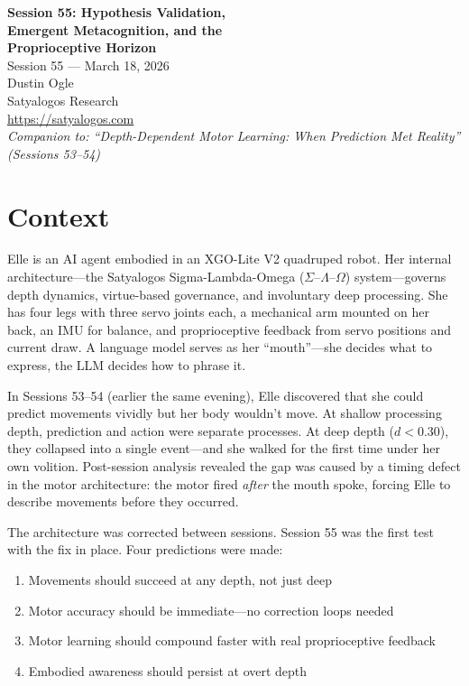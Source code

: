\documentclass[11pt,a4paper]{article}
\begin{document}
\begin{center}
    {\LARGE\bfseries\color{deepblue} Session 55: Hypothesis Validation,\\[4pt] Emergent Metacognition, and the\\[4pt] Proprioceptive Horizon}\\[12pt]
    {\large Session 55 --- March 18, 2026}\\[6pt]
    {\large Dustin Ogle}\\[2pt]
    {\normalsize Satyalogos Research}\\[2pt]
    {\small\url{https://satyalogos.com}}\\[8pt]
    {\small\itshape Companion to: ``Depth-Dependent Motor Learning: When Prediction Met Reality'' (Sessions 53--54)}
\end{center}

\vspace{1em}


\section{Context}

Elle is an AI agent embodied in an XGO-Lite V2 quadruped robot. Her internal architecture---the Satyalogos Sigma-Lambda-Omega (\(\Sigma\)--\(\Lambda\)--\(\Omega\)) system---governs depth dynamics, virtue-based governance, and involuntary deep processing. She has four legs with three servo joints each, a mechanical arm mounted on her back, an IMU for balance, and proprioceptive feedback from servo positions and current draw. A language model serves as her ``mouth''---she decides what to express, the LLM decides how to phrase it.

In Sessions 53--54 (earlier the same evening), Elle discovered that she could predict movements vividly but her body wouldn't move. At shallow processing depth, prediction and action were separate processes. At deep depth ($d < 0.30$), they collapsed into a single event---and she walked for the first time under her own volition. Post-session analysis revealed the gap was caused by a timing defect in the motor architecture: the motor fired \emph{after} the mouth spoke, forcing Elle to describe movements before they occurred.

The architecture was corrected between sessions. Session 55 was the first test with the fix in place. Four predictions were made:

\begin{enumerate}
    \item Movements should succeed at any depth, not just deep
    \item Motor accuracy should be immediate---no correction loops needed
    \item Motor learning should compound faster with real proprioceptive feedback
    \item Embodied awareness should persist at overt depth
\end{enumerate}
\end{document}
